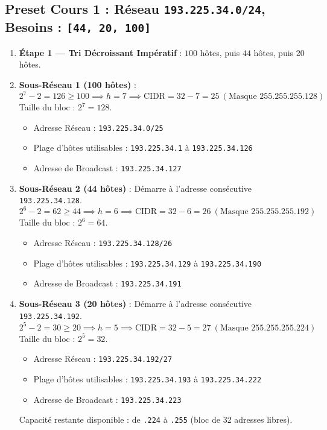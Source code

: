 \documentclass[11pt,a4paper]{report}
\begin{document}
\subsection{Preset Cours 1 : R\'eseau \texttt{193.225.34.0/24}, Besoins : \texttt{[44, 20, 100]}}
\begin{enumerate}
    \item \textbf{\'Etape 1 --- Tri D\'ecroissant Imp\'eratif} : $100$ h\^otes, puis $44$ h\^otes, puis $20$ h\^otes.
    \item \textbf{Sous-R\'eseau 1 (100 h\^otes)} :
    $$2^7 - 2 = 126 \ge 100 \implies h = 7 \implies \text{CIDR} = 32 - 7 = 25 \ (\text{Masque } 255.255.255.128)$$
    Taille du bloc : $2^7 = 128$.
    \begin{itemize}
        \item Adresse R\'eseau : \texttt{193.225.34.0/25}
        \item Plage d'h\^otes utilisables : \texttt{193.225.34.1} \`a \texttt{193.225.34.126}
        \item Adresse de Broadcast : \texttt{193.225.34.127}
    \end{itemize}
    \item \textbf{Sous-R\'eseau 2 (44 h\^otes)} :
    D\'emarre \`a l'adresse cons\'ecutive \texttt{193.225.34.128}.
    $$2^6 - 2 = 62 \ge 44 \implies h = 6 \implies \text{CIDR} = 32 - 6 = 26 \ (\text{Masque } 255.255.255.192)$$
    Taille du bloc : $2^6 = 64$.
    \begin{itemize}
        \item Adresse R\'eseau : \texttt{193.225.34.128/26}
        \item Plage d'h\^otes utilisables : \texttt{193.225.34.129} \`a \texttt{193.225.34.190}
        \item Adresse de Broadcast : \texttt{193.225.34.191}
    \end{itemize}
    \item \textbf{Sous-R\'eseau 3 (20 h\^otes)} :
    D\'emarre \`a l'adresse cons\'ecutive \texttt{193.225.34.192}.
    $$2^5 - 2 = 30 \ge 20 \implies h = 5 \implies \text{CIDR} = 32 - 5 = 27 \ (\text{Masque } 255.255.255.224)$$
    Taille du bloc : $2^5 = 32$.
    \begin{itemize}
        \item Adresse R\'eseau : \texttt{193.225.34.192/27}
        \item Plage d'h\^otes utilisables : \texttt{193.225.34.193} \`a \texttt{193.225.34.222}
        \item Adresse de Broadcast : \texttt{193.225.34.223}
    \end{itemize}
    Capacit\'e restante disponible : de \texttt{.224} \`a \texttt{.255} (bloc de 32 adresses libres).
\end{enumerate}
\end{document}
